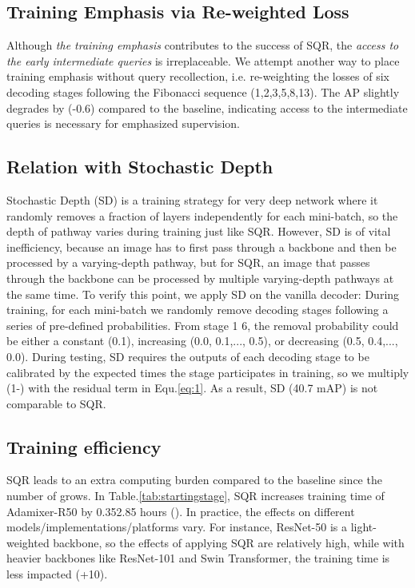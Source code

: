 \documentclass[10pt,twocolumn,letterpaper]{article}
\begin{document}
\subsection{Training Emphasis via Re-weighted Loss}
Although \textit{the training emphasis} contributes to the success of SQR, the \textit{access to the early intermediate queries} is irreplaceable. We attempt another way to place training emphasis without query recollection, i.e. re-weighting the losses of six decoding stages following the Fibonacci sequence (1,2,3,5,8,13). The AP slightly degrades by (-0.6) compared to the baseline, indicating access to the intermediate queries is necessary for emphasized supervision.

\subsection{Relation with Stochastic Depth}
Stochastic Depth (SD) \cite{Huang2016DeepNW} is a training strategy for very deep network where it randomly removes a fraction of layers independently for each mini-batch, so the depth of pathway varies during training just like SQR. However, SD is of vital inefficiency, because an image has to first pass through a backbone and then be processed by a varying-depth pathway, but for SQR, an image that passes through the backbone can be processed by multiple varying-depth pathways at the same time. To verify this point, we apply SD on the vanilla decoder: During training, for each mini-batch we randomly remove decoding stages following a series of pre-defined probabilities. From stage 1 6, the removal probability  could be either a constant (0.1), increasing (0.0, 0.1,..., 0.5), or decreasing (0.5, 0.4,..., 0.0). During testing, SD requires the outputs of each decoding stage to be calibrated by the expected times the stage participates in training, so we multiply (1-) with the residual term in Equ.\ref{eq:1}. As a result, SD (40.7 mAP) is not comparable to SQR. 




\subsection{Training efficiency}


SQR leads to an extra computing burden compared to the baseline since the number of  grows. In Table.\ref{tab:startingstage}, SQR increases training time of Adamixer-R50 by 0.352.85 hours (). In practice, the effects on different models/implementations/platforms vary. For instance, ResNet-50 is a light-weighted backbone, so the effects of applying SQR are relatively high, while with heavier backbones like ResNet-101 and Swin Transformer\cite{Liu2021SwinTH}, the training time is less impacted (+10). 
\end{document}
